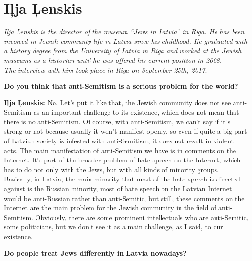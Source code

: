 \section{Iļja Ļenskis}

\textit{Iļja Ļenskis is the director of the museum ``Jews in Latvia'' in Riga. He has been involved in Jewish communty life in Latvia since his childhood. He graduated with a history degree from the University of Latvia in Riga and worked at the Jewish museums as a historian until he was offered his current position in 2008. \\
The interview with him took place in Riga on September 25th, 2017}.\par
\vspace*{2em}

\textbf{Do you think that anti-Semitism is a serious problem for the world?}

\textbf{Iļja Ļenskis:} No. Let’s put it like that, the Jewish community does not see anti-Semitism as an important challenge to its existence, which does not mean that there is no anti-Semitism. Of course, with anti-Semitism, we can’t say if it’s strong or not because usually it won’t manifest openly, so even if quite a big part of Latvian society is infested with anti-Semitism, it does not result in violent acts. The main manifestation of anti-Semitism we have is in comments on the Internet. It’s part of the broader problem of hate speech on the Internet, which has to do not only with the Jews, but with all kinds of minority groups. Basically, in Latvia, the main minority that most of the hate speech is directed against is the Russian minority, most of hate speech on the Latvian Internet would be anti-Russian rather than anti-Semitic, but still, these comments on the Internet are the main problem for the Jewish community in the field of anti-Semitism. Obviously, there are some prominent intellectuals who are anti-Semitic, some politicians, but we don’t see it as a main challenge, as I said, to our existence. 

\textbf{Do people treat Jews differently in Latvia nowadays?} 

